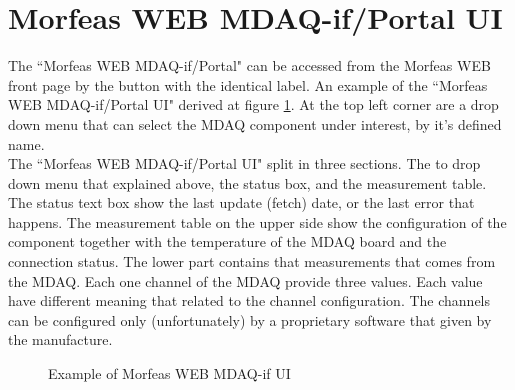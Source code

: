 \section{Morfeas WEB MDAQ-if/Portal UI}

The ``Morfeas WEB MDAQ-if/Portal" can be accessed from the Morfeas WEB front page by the button with the identical label.
An example of the ``Morfeas WEB MDAQ-if/Portal UI" derived at figure \ref{fig:MDAQ-if_UI}.
At the top left corner are a drop down menu that can select the MDAQ component under interest, by it's defined name.\\

\noindent The ``Morfeas WEB MDAQ-if/Portal UI" split in three sections.
The to drop down menu that explained above, the status box, and the measurement table.
The status text box show the last update (fetch) date, or the last error that happens.
The measurement table on the upper side show the configuration of the component together with the temperature of the MDAQ board and the connection status.
The lower part contains that measurements that comes from the MDAQ.
Each one channel of the MDAQ provide three values. Each value have different meaning that related to the channel configuration.
The channels can be configured only (unfortunately) by a proprietary software that given by the manufacture.

\begin{figure}[h]
\centering
	\caption{Example of Morfeas WEB MDAQ-if UI}
	\label{fig:MDAQ-if_UI}
\end{figure}